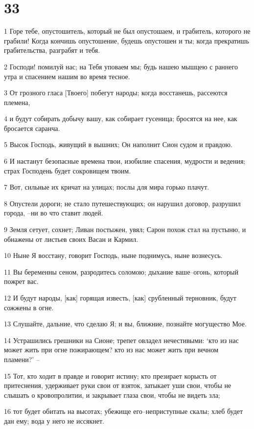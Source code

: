 \chapter{33}

\par 1 Горе тебе, опустошитель, который не был опустошаем, и грабитель, которого не грабили! Когда кончишь опустошение, будешь опустошен и ты; когда прекратишь грабительства, разграбят и тебя.
\par 2 Господи! помилуй нас; на Тебя уповаем мы; будь нашею мышцею с раннего утра и спасением нашим во время тесное.
\par 3 От грозного гласа [Твоего] побегут народы; когда восстанешь, рассеются племена,
\par 4 и будут собирать добычу вашу, как собирает гусеница; бросятся на нее, как бросается саранча.
\par 5 Высок Господь, живущий в вышних; Он наполнит Сион судом и правдою.
\par 6 И настанут безопасные времена твои, изобилие спасения, мудрости и ведения; страх Господень будет сокровищем твоим.
\par 7 Вот, сильные их кричат на улицах; послы для мира горько плачут.
\par 8 Опустели дороги; не стало путешествующих; он нарушил договор, разрушил города, --ни во что ставит людей.
\par 9 Земля сетует, сохнет; Ливан постыжен, увял; Сарон похож стал на пустыню, и обнажены от листьев своих Васан и Кармил.
\par 10 Ныне Я восстану, говорит Господь, ныне поднимусь, ныне вознесусь.
\par 11 Вы беременны сеном, разродитесь соломою; дыхание ваше--огонь, который пожрет вас.
\par 12 И будут народы, [как] горящая известь, [как] срубленный терновник, будут сожжены в огне.
\par 13 Слушайте, дальние, что сделаю Я; и вы, ближние, познайте могущество Мое.
\par 14 Устрашились грешники на Сионе; трепет овладел нечестивыми: `кто из нас может жить при огне пожирающем? кто из нас может жить при вечном пламени?' --
\par 15 Тот, кто ходит в правде и говорит истину; кто презирает корысть от притеснения, удерживает руки свои от взяток, затыкает уши свои, чтобы не слышать о кровопролитии, и закрывает глаза свои, чтобы не видеть зла;
\par 16 тот будет обитать на высотах; убежище его--неприступные скалы; хлеб будет дан ему; вода у него не иссякнет.

